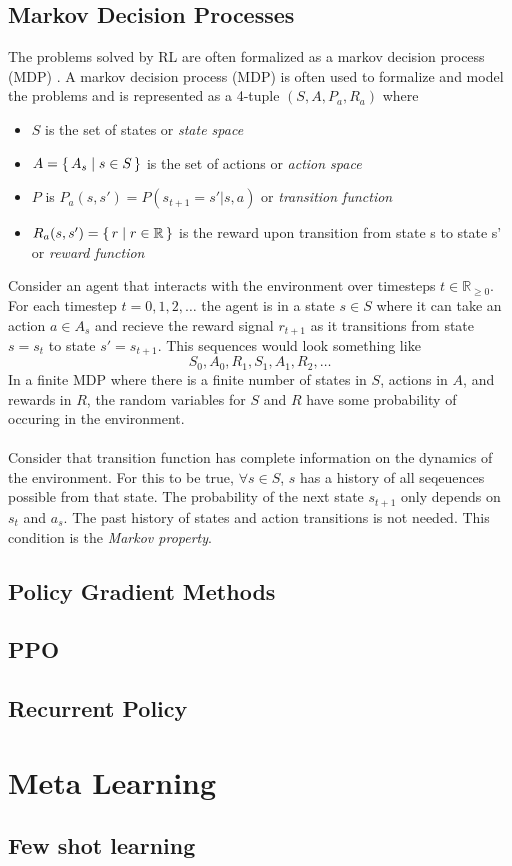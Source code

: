 \subsection{Markov Decision Processes}
The problems solved by RL are often formalized as a markov decision process 
(MDP) \cite{Bel:57}.
A markov decision process (MDP) is often used to formalize and model the problems and is
represented as a 4-tuple $(S, A, P_a, R_a)$ where 
\begin{itemize}
    \item $S$ is the set of states or \textit{state space}
    \item $A=\set{A_s | s \in S}$ is the set of actions or \textit{action space}
    \item $P$ is $P_a(s, s') = P(s_{t+1} = s' | s, a)$ or \textit{transition function}
    \item $R_a(s, s')=\set{r | r \in \mathbb R}$ is the reward upon transition from state s to state s' or \textit{reward function}
\end{itemize}
Consider an agent that interacts with the environment over timesteps 
$t \in \mathbb{R}_{\geq 0}$. For each timestep $t=0,1,2,\ldots$ the agent is in a state
$s \in S$ where it can take an action $a \in A_s$ and recieve the reward signal $r_{t+1}$ 
as it transitions from state $s=s_t$ to state $s'=s_{t+1}$. This sequences would look
something like
\begin{equation}
    S_0, A_0, R_1, S_1, A_1, R_2, \ldots
\end{equation}
In a finite MDP where there is a finite number of states in $S$, actions in $A$, and rewards
in $R$, the random variables for $S$ and $R$ have some probability of occuring in the 
environment. 
\\\\
Consider that transition function has complete information on the dynamics of the 
environment. For this to be true, $\forall s \in S$, $s$ has a history of all seqeuences 
possible from that state. The probability of the next state $s_{t+1}$ only depends 
on $s_{t}$ and $a_s$. The past history of states and action transitions is not needed.
This condition is the \textit{Markov property}.
\subsection{Policy Gradient Methods}
\subsection{PPO}
\subsection{Recurrent Policy}
\section{Meta Learning}
\subsection{Few shot learning}
